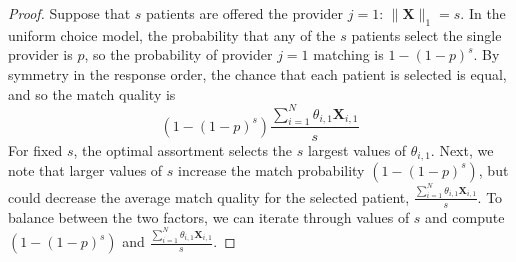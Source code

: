 \thmmone* 
\begin{proof}
Suppose that $s$ patients are offered the provider $j=1$: $\lVert \mathbf{X} \rVert_{1} = s$. 
In the uniform choice model, the probability that any of the $s$ patients select the single provider is $p$, so the probability of provider $j=1$ matching is $1-(1-p)^{s}$. 
By symmetry in the response order, the chance that each patient is selected is equal, and so the match quality is 
\begin{equation}
    (1-(1-p)^{s}) \frac{\sum_{i=1}^{N} \theta_{i,1} \mathbf{X}_{i,1}}{s}
\end{equation}
For fixed $s$, the optimal assortment selects the $s$ largest values of $\theta_{i,1}$. 
Next, we note that larger values of $s$ increase the match probability $(1-(1-p)^{s})$, but could decrease the average match quality for the selected patient, $\frac{\sum_{i=1}^{N} \theta_{i,1} \mathbf{X}_{i,1}}{s}$. 
To balance between the two factors, we can iterate through values of $s$ and compute $(1-(1-p)^{s})$ and $\frac{\sum_{i=1}^{N} \theta_{i,1} \mathbf{X}_{i,1}}{s}$. 
\end{proof}

